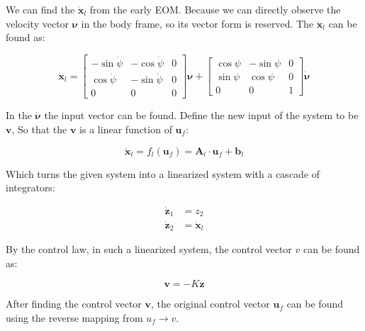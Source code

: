 We can find the $\dot{\boldsymbol{x}}_l$ from the early EOM. Because we can directly observe the velocity vector $\boldsymbol{\nu}$ in the body frame, so its vector form is reserved. The $\ddot{\boldsymbol{x}}_l$ can be found as:

\begin{equation}
    \ddot{\boldsymbol{x}}_l=\left[\begin{array}{ccc}
        -\sin{\dot{\psi}} & -\cos{\dot{\psi}} & 0  \\
        \cos{\dot{\psi}} & -\sin{\dot{\psi}} & 0 \\
        0 & 0 & 0
    \end{array}\right]\boldsymbol{\nu}+\left[\begin{array}{ccc}
        \cos{\psi} & -\sin{\psi} & 0  \\
        \sin{\psi} & \cos{\psi} & 0 \\
        0 & 0 & 1
    \end{array}\right]\dot{\boldsymbol{\nu}}
\end{equation}

In the $\dot{\boldsymbol{\nu}}$ the input vector can be found. Define the new input of the system to be $\boldsymbol{v}$, So that the $\boldsymbol{v}$ is a linear function of $\boldsymbol{u}_f$:

\begin{equation}
    \ddot{\boldsymbol{x}}_l=f_l(\boldsymbol{u}_f)=\boldsymbol{A}_l\cdot\boldsymbol{u}_f+\boldsymbol{b}_l
\end{equation}

Which turns the given system into a linearized system with a cascade of integrators:

\begin{equation}
    \begin{split}
        \dot{\boldsymbol{z}}_1 &= z_2 \\
        \dot{\boldsymbol{z}}_2 &= \ddot{\boldsymbol{x}}_l
    \end{split}
\end{equation}

By the control law, in such a linearized system, the control vector $v$ can be found as:

\begin{equation}
    \boldsymbol{v}=-K\boldsymbol{z}
\end{equation}

After finding the control vector $\boldsymbol{v}$, the original control vector $\boldsymbol{u}_f$ can be found using the reverse mapping from $u_f\rightarrow v$.

